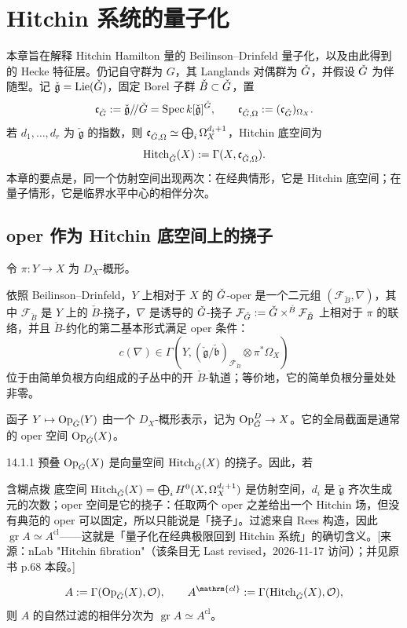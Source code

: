 \chapter{Hitchin 系统的量子化}\label{ch:14}
本章旨在解释 Hitchin Hamilton 量的 Beilinson–Drinfeld 量子化，以及由此得到的 Hecke 特征层\cite{BD91,BD05}。仍记自守群为 $G$，其 Langlands 对偶群为 $\check{G}$，并假设 $\check{G}$ 为伴随型。记 $\check{\mathfrak g}=\operatorname{Lie}(\check{G})$，固定 Borel 子群 $\check B\subset\check{G}$，置
\[\mathfrak c_{\check{G}}:=\check{\mathfrak g}/\!/\check{G}=\operatorname{Spec} k[\check{\mathfrak g}]^{\check{G}},\qquad
\mathfrak c_{\check{G},\Omega}:=(\mathfrak c_{\check{G}})_{\Omega_X}.\]
若 $d_1,\ldots,d_r$ 为 $\check{\mathfrak g}$ 的指数，则 $\mathfrak c_{\check{G},\Omega}\simeq\bigoplus_i\Omega_X^{d_i+1}$，Hitchin 底空间为
\[\operatorname{Hitch}_{\check{G}}(X):=\Gamma(X,\mathfrak c_{\check{G},\Omega}).\]
本章的要点是，同一个仿射空间出现两次：在经典情形，它是 Hitchin 底空间；在量子情形，它是临界水平中心的相伴分次。

\section{oper 作为 Hitchin 底空间上的挠子}\label{sec:14.1}
令 $\pi:Y\to X$ 为 $D_X$-概形。
\begin{definition*}{}
依照 Beilinson–Drinfeld\cite{BD05}，$Y$ 上相对于 $X$ 的 $\check{G}$-oper 是一个二元组 $(\mathcal F_{\check B},\nabla)$，其中 $\mathcal F_{\check B}$ 是 $Y$ 上的 $\check B$-挠子，$\nabla$ 是诱导的 $\check{G}$-挠子 $\mathcal F_{\check{G}}:=\check{G}\times^{\check B}\mathcal F_{\check B}$ 上相对于 $\pi$ 的联络，并且 $\check B$-约化的第二基本形式满足 oper 条件：
\[c(\nabla)\in\Gamma(Y,(\check{\mathfrak g}/\check{\mathfrak b})_{\mathcal F_{\check B}}\otimes\pi^*\Omega_X)\]
位于由简单负根方向组成的子丛中的开 $\check B$-轨道；等价地，它的简单负根分量处处非零。
\end{definition*}
函子 $Y\mapsto\operatorname{Op}_{\check{G}}(Y)$ 由一个 $D_X$-概形表示，记为 $\operatorname{Op}^D_{\check{G}}\to X$。它的全局截面是通常的 oper 空间 $\operatorname{Op}_{\check{G}}(X)$。
\begin{proposition}{}{14.1.1}
预叠 $\operatorname{Op}_{\check{G}}(X)$ 是向量空间 $\operatorname{Hitch}_{\check{G}}(X)$ 的挠子。因此，若

\begin{transnote}{含糊点拨}
底空间 $\operatorname{Hitch}_{\check{G}}(X)=\bigoplus_i H^0(X,\Omega_X^{d_i+1})$ 是仿射空间，$d_i$ 是 $\check{\mathfrak g}$ 齐次生成元的次数；oper 空间是它的挠子：任取两个 oper 之差给出一个 Hitchin 场，但没有典范的 oper 可以固定，所以只能说是「挠子」。过滤来自 Rees 构造，因此 $\operatorname{gr} A\simeq A^{\mathrm{cl}}$——这就是「量子化在经典极限回到 Hitchin 系统」的确切含义。[来源：nLab "Hitchin fibration"（该条目无 Last revised，2026-11-17 访问）；并见原书 p.68 本段。]
\end{transnote}
\[A:=\Gamma(\Op_{\checkG}(X),\cO),\qquad A^{\mathrm{cl}}:=\Gamma(\operatorname{Hitch}_{\checkG}(X),\cO),\]
则 $A$ 的自然过滤的相伴分次为 $\operatorname{gr}A\simeq A^{\mathrm{cl}}$。
\end{proposition}

